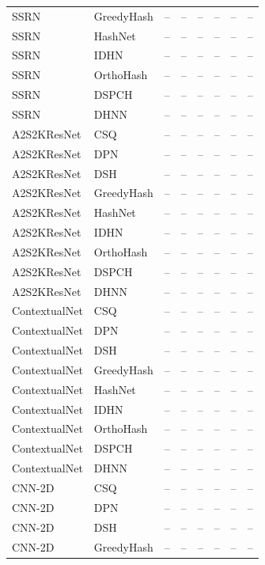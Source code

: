 \begin{longtable}{llrrrrrr}
SSRN & GreedyHash & -- & -- & -- & -- & -- & -- \\
SSRN & HashNet & -- & -- & -- & -- & -- & -- \\
SSRN & IDHN & -- & -- & -- & -- & -- & -- \\
SSRN & OrthoHash & -- & -- & -- & -- & -- & -- \\
SSRN & DSPCH & -- & -- & -- & -- & -- & -- \\
SSRN & DHNN & -- & -- & -- & -- & -- & -- \\
\addlinespace
A2S2KResNet & CSQ & -- & -- & -- & -- & -- & -- \\
A2S2KResNet & DPN & -- & -- & -- & -- & -- & -- \\
A2S2KResNet & DSH & -- & -- & -- & -- & -- & -- \\
A2S2KResNet & GreedyHash & -- & -- & -- & -- & -- & -- \\
A2S2KResNet & HashNet & -- & -- & -- & -- & -- & -- \\
A2S2KResNet & IDHN & -- & -- & -- & -- & -- & -- \\
A2S2KResNet & OrthoHash & -- & -- & -- & -- & -- & -- \\
A2S2KResNet & DSPCH & -- & -- & -- & -- & -- & -- \\
A2S2KResNet & DHNN & -- & -- & -- & -- & -- & -- \\
\addlinespace
ContextualNet & CSQ & -- & -- & -- & -- & -- & -- \\
ContextualNet & DPN & -- & -- & -- & -- & -- & -- \\
ContextualNet & DSH & -- & -- & -- & -- & -- & -- \\
ContextualNet & GreedyHash & -- & -- & -- & -- & -- & -- \\
ContextualNet & HashNet & -- & -- & -- & -- & -- & -- \\
ContextualNet & IDHN & -- & -- & -- & -- & -- & -- \\
ContextualNet & OrthoHash & -- & -- & -- & -- & -- & -- \\
ContextualNet & DSPCH & -- & -- & -- & -- & -- & -- \\
ContextualNet & DHNN & -- & -- & -- & -- & -- & -- \\
\addlinespace
CNN-2D & CSQ & -- & -- & -- & -- & -- & -- \\
CNN-2D & DPN & -- & -- & -- & -- & -- & -- \\
CNN-2D & DSH & -- & -- & -- & -- & -- & -- \\
CNN-2D & GreedyHash & -- & -- & -- & -- & -- & -- \\

\end{longtable}
